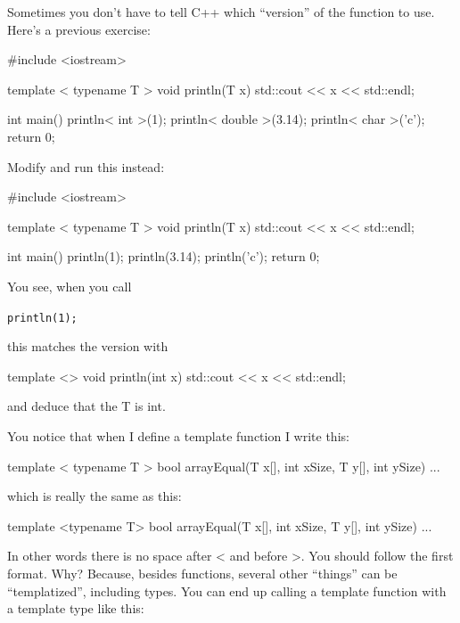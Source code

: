 Sometimes you don't have to tell C++ which ``version''
of the function to use. Here's a previous exercise:

\begin{consolethree}[escapeinside=||]
#include <iostream>

template < typename T >
void println(T x)
{
    std::cout << x << std::endl;
}

int main()
{
    println< int >(1);
    println< double >(3.14);
    println< char >('c');
    return 0;
}
\end{consolethree}

Modify and run this instead:

\begin{consolethree}[escapeinside=||]
#include <iostream>

template < typename T >
void println(T x)
{
    std::cout << x << std::endl;
}

int main()
{
    println(1);
    println(3.14);
    println('c');
    return 0;
}
\end{consolethree}

You see, when you call

\verb!println(1);!

this matches the version with

\begin{consolethree}[escapeinside=||]
template <>
void println(int x)
{
    std::cout << x << std::endl;
}
\end{consolethree}

and deduce that the T is int.



\newpage{}

You notice that when I define a template function I write this:

\begin{consolethree}[escapeinside=||]
template < typename T >
bool arrayEqual(T x[], int xSize, T y[], int ySize)
{
    ...
}
\end{consolethree}

which is really the same as this:

\begin{consolethree}[escapeinside=||]
template <typename T>
bool arrayEqual(T x[], int xSize, T y[], int ySize)
{
    ...
}
\end{consolethree}

In other words there is no space after < and before
>. You should follow the first format. Why? Because, besides
functions, several other ``things'' can be ``templatized'', including
types. You can end up calling a template function with a template type
like this:

